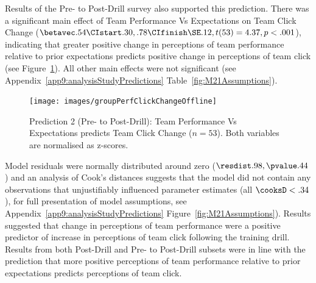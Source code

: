 \begin{CJK}{UTF8}{gbsn}
Results of the Pre- to Post-Drill survey also supported this prediction.  There was a significant main effect of Team Performance Vs Expectations on Team Click Change ($\betavec .54 \CIstart .30, .78 \CIfinish \SE .12, t(53) = 4.37, p < .001$), indicating that greater positive change in perceptions of team performance relative to prior expectations predicts positive change in perceptions of team click (see Figure~\ref{fig:groupPerfClickChangeCondition}).  All other main effects were not significant (see Appendix~\ref{app9:analysisStudyPredictions} Table~\ref{fig:M21Assumptions}).




 \begin{figure}
     \centering
     \texttt{[image: images/groupPerfClickChangeOffline]}
     \caption{Prediction 2 (Pre- to Post-Drill): Team Performance Vs Expectations predicts Team Click Change ($n = 53$).  Both variables are normalised as z-scores.}
     \label{fig:groupPerfClickChangeCondition}
 \end{figure}

Model residuals were normally distributed around zero ($\resdist .98, \pvalue .44$) and an analysis of Cook's distances suggests that the model did not contain any observations that unjustifiably influenced parameter estimates (all $\cooksD < .34$), for full presentation of model assumptions, see Appendix~\ref{app9:analysisStudyPredictions} Figure~\ref{fig:M21Assumptions}).  Results suggested that change in perceptions of team performance were a positive predictor of increase in perceptions of team click following the training drill.  Results from both Post-Drill and Pre- to Post-Drill subsets were in line with the prediction that more positive perceptions of team performance relative to prior expectations predicts perceptions of team click.




\end{CJK}
